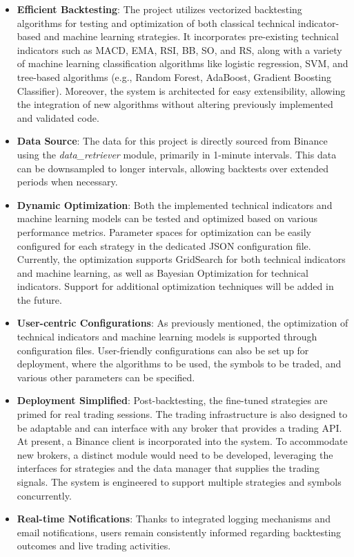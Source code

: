 \begin{itemize}
    \item \textbf{Efficient Backtesting}: The project utilizes vectorized backtesting algorithms for testing and optimization of both classical technical indicator-based and machine learning strategies. It incorporates pre-existing technical indicators such as MACD, EMA, RSI, BB, SO, and RS, along with a variety of machine learning classification algorithms like logistic regression, SVM, and tree-based algorithms (e.g., Random Forest, AdaBoost, Gradient Boosting Classifier). Moreover, the system is architected for easy extensibility, allowing the integration of new algorithms without altering previously implemented and validated code. \newpage

    \item \textbf{Data Source}: The data for this project is directly sourced from Binance using the \textit{data\_retriever} module, primarily in 1-minute intervals. This data can be downsampled to longer intervals, allowing backtests over extended periods when necessary.

    \item \textbf{Dynamic Optimization}: Both the implemented technical indicators and machine learning models can be tested and optimized based on various performance metrics. Parameter spaces for optimization can be easily configured for each strategy in the dedicated JSON configuration file. Currently, the optimization supports GridSearch for both technical indicators and machine learning, as well as Bayesian Optimization for technical indicators. Support for additional optimization techniques will be added in the future.

    \item \textbf{User-centric Configurations}: As previously mentioned, the optimization of technical indicators and machine learning models is supported through configuration files. User-friendly configurations can also be set up for deployment, where the algorithms to be used, the symbols to be traded, and various other parameters can be specified.

    \item \textbf{Deployment Simplified}: Post-backtesting, the fine-tuned strategies are primed for real trading sessions. The trading infrastructure is also designed to be adaptable and can interface with any broker that provides a trading API. At present, a Binance client is incorporated into the system. To accommodate new brokers, a distinct module would need to be developed, leveraging the interfaces for strategies and the data manager that supplies the trading signals. The system is engineered to support multiple strategies and symbols concurrently.

    \item \textbf{Real-time Notifications}: Thanks to integrated logging mechanisms and email notifications, users remain consistently informed regarding backtesting outcomes and live trading activities.

\end{itemize}



